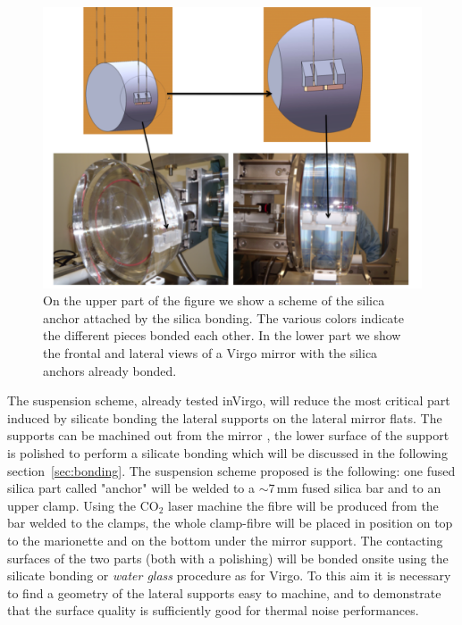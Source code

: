 \begin{figure}[htbp]
\begin{center}
\includegraphics[width=1\textwidth]{Sec_Suspensions/Figures/ET_mirror_HF.pdf}
\caption{On the upper part of the figure we show a scheme of the silica anchor  attached  by the silica bonding.
The various colors indicate the different pieces bonded each other. In the lower part we show  the frontal and  lateral views of a Virgo mirror with the silica anchors already bonded.}
\label{fig:ET_HF_mirror}
\end{center}
\end{figure}


The suspension scheme, already tested inVirgo, will  reduce the most critical part induced by silicate bonding the lateral supports on the lateral mirror flats. The supports can be machined out from the mirror , the lower surface of the support is polished to perform a silicate bonding which will be discussed in the following section~\ref{sec:bonding}.
The suspension scheme proposed is the following:
one fused silica part called "anchor" will be welded to a $\sim 7$\,mm fused silica bar and to an upper clamp.
Using the CO$_2$ laser machine the fibre will be produced from the bar welded to the clamps, the whole clamp-fibre will be placed in position on top to the marionette and on the bottom under the mirror support. The contacting surfaces of the two parts (both with a polishing) will be bonded onsite using the silicate bonding or \emph{water glass} procedure as for Virgo. To this aim it is necessary to find a geometry of the lateral supports easy to machine, and to demonstrate that the surface quality is sufficiently good for thermal noise performances.

